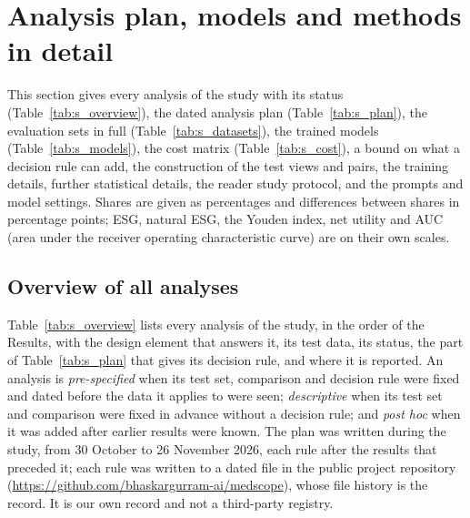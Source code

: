 \section{Analysis plan, models and methods in detail}
\label{sec:s_plan}

This section gives every analysis of the study with its status (Table~\ref{tab:s_overview}), the dated analysis plan (Table~\ref{tab:s_plan}), the evaluation sets in full (Table~\ref{tab:s_datasets}), the trained models (Table~\ref{tab:s_models}), the cost matrix (Table~\ref{tab:s_cost}), a bound on what a decision rule can add, the construction of the test views and pairs, the training details, further statistical details, the reader study protocol, and the prompts and model settings. Shares are given as percentages and differences between shares in percentage points; ESG, natural ESG, the Youden index, net utility and AUC (area under the receiver operating characteristic curve) are on their own scales.

\subsection{Overview of all analyses}

Table~\ref{tab:s_overview} lists every analysis of the study, in the order of the Results, with the design element that answers it, its test data, its status, the part of Table~\ref{tab:s_plan} that gives its decision rule, and where it is reported. An analysis is \emph{pre-specified} when its test set, comparison and decision rule were fixed and dated before the data it applies to were seen; \emph{descriptive} when its test set and comparison were fixed in advance without a decision rule; and \emph{post hoc} when it was added after earlier results were known. The plan was written during the study, from 30 October to 26 November 2026, each rule after the results that preceded it; each rule was written to a dated file in the public project repository (\url{https://github.com/bhaskargurram-ai/medscope}), whose file history is the record. It is our own record and not a third-party registry.

